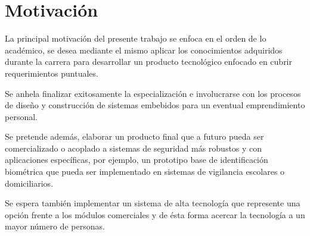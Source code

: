 





\section{Motivación}

La principal motivación del presente trabajo se enfoca en el orden de lo académico, se desea mediante el mismo aplicar los conocimientos adquiridos durante la carrera para desarrollar un producto tecnológico enfocado en cubrir requerimientos puntuales.

Se anhela finalizar exitosamente la especialización e involucrarse con los procesos de diseño y construcción de sistemas embebidos para un eventual emprendimiento personal. 

Se pretende además, elaborar un producto final que a futuro pueda ser comercializado o acoplado a sistemas de seguridad más robustos y con aplicaciones específicas, por ejemplo, un prototipo base de identificación biométrica que pueda ser implementado en sistemas de vigilancia escolares o domiciliarios.

Se espera también implementar un sistema de alta tecnología que represente una opción frente a los módulos comerciales y de ésta forma acercar la tecnología a un mayor número de personas.





